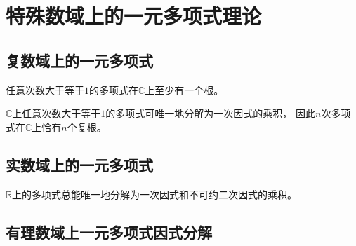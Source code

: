 \section{特殊数域上的一元多项式理论}




\subsection{复数域上的一元多项式}

\begin{theorem}[代数学基本定理]
  任意次数大于等于$1$的多项式在$\mathbb{C}$上至少有一个根。
\end{theorem}

\begin{theorem}[复数域因式分解]
  $\mathbb{C}$上任意次数大于等于$1$的多项式可唯一地分解为一次因式的乘积，
  因此$n$次多项式在$\mathbb{C}$上恰有$n$个复根。
\end{theorem}

\subsection{实数域上的一元多项式}

\begin{theorem}[实数域因式分解]
  $\mathbb{R}$上的多项式总能唯一地分解为一次因式和不可约二次因式的乘积。
\end{theorem}


\subsection{有理数域上一元多项式因式分解}

